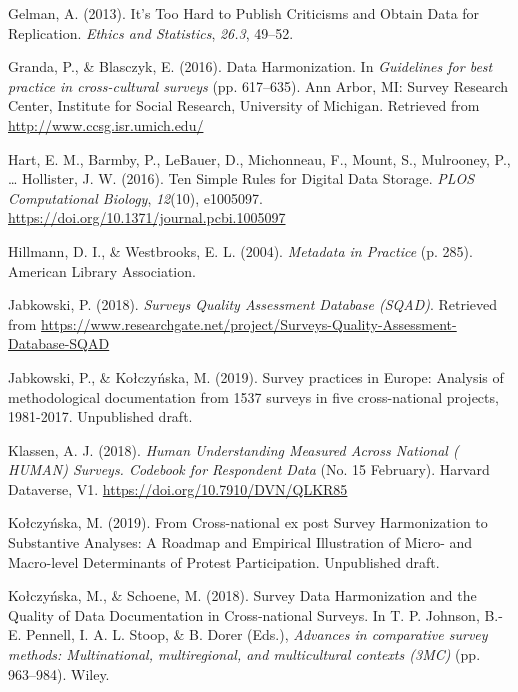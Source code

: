 \documentclass[12pt,]{article}
\begin{document}
\leavevmode\hypertarget{ref-Gelman2013}{}%
Gelman, A. (2013). It's Too Hard to Publish Criticisms and Obtain Data for Replication. \emph{Ethics and Statistics}, \emph{26.3}, 49--52.

\leavevmode\hypertarget{ref-Granda2016}{}%
Granda, P., \& Blasczyk, E. (2016). Data Harmonization. In \emph{Guidelines for best practice in cross-cultural surveys} (pp. 617--635). Ann Arbor, MI: Survey Research Center, Institute for Social Research, University of Michigan. Retrieved from \url{http://www.ccsg.isr.umich.edu/}

\leavevmode\hypertarget{ref-Hart2016}{}%
Hart, E. M., Barmby, P., LeBauer, D., Michonneau, F., Mount, S., Mulrooney, P., \ldots{} Hollister, J. W. (2016). Ten Simple Rules for Digital Data Storage. \emph{PLOS Computational Biology}, \emph{12}(10), e1005097. \url{https://doi.org/10.1371/journal.pcbi.1005097}

\leavevmode\hypertarget{ref-Hillmann2004}{}%
Hillmann, D. I., \& Westbrooks, E. L. (2004). \emph{Metadata in Practice} (p. 285). American Library Association.

\leavevmode\hypertarget{ref-Jabkowski2018}{}%
Jabkowski, P. (2018). \emph{Surveys Quality Assessment Database (SQAD)}. Retrieved from \url{https://www.researchgate.net/project/Surveys-Quality-Assessment-Database-SQAD}

\leavevmode\hypertarget{ref-Jabkowski2019}{}%
Jabkowski, P., \& Kołczyńska, M. (2019). Survey practices in Europe: Analysis of methodological documentation from 1537 surveys in five cross-national projects, 1981-2017. Unpublished draft.

\leavevmode\hypertarget{ref-Klassen2018}{}%
Klassen, A. J. (2018). \emph{Human Understanding Measured Across National ( HUMAN) Surveys. Codebook for Respondent Data} (No. 15 February). Harvard Dataverse, V1. \url{https://doi.org/10.7910/DVN/QLKR85}

\leavevmode\hypertarget{ref-Kolczynska2019}{}%
Kołczyńska, M. (2019). From Cross-national ex post Survey Harmonization to Substantive Analyses: A Roadmap and Empirical Illustration of Micro- and Macro-level Determinants of Protest Participation. Unpublished draft.

\leavevmode\hypertarget{ref-KolczynskaSchoene2018}{}%
Kołczyńska, M., \& Schoene, M. (2018). Survey Data Harmonization and the Quality of Data Documentation in Cross‐national Surveys. In T. P. Johnson, B.-E. Pennell, I. A. L. Stoop, \& B. Dorer (Eds.), \emph{Advances in comparative survey methods: Multinational, multiregional, and multicultural contexts (3MC)} (pp. 963--984). Wiley.
\end{document}
